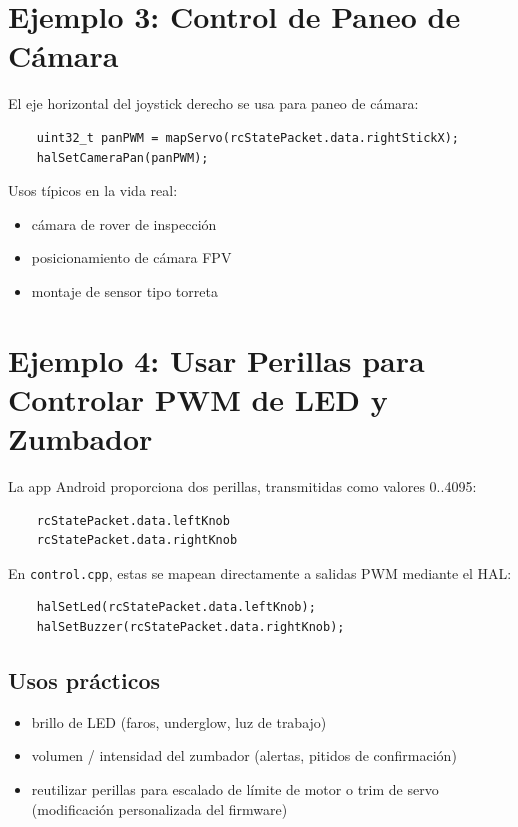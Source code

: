 \section{Ejemplo 3: Control de Paneo de Cámara}
\label{sec:example-camera}

El eje horizontal del joystick derecho se usa para paneo de cámara:

\begin{verbatim}
    uint32_t panPWM = mapServo(rcStatePacket.data.rightStickX);
    halSetCameraPan(panPWM);
\end{verbatim}

\noindent Usos típicos en la vida real:
\begin{itemize}
    \item cámara de rover de inspección
    \item posicionamiento de cámara FPV
    \item montaje de sensor tipo torreta
\end{itemize}

\section{Ejemplo 4: Usar Perillas para Controlar PWM de LED y Zumbador}
\label{sec:example-knobs}

La app Android proporciona dos perillas, transmitidas como valores 0..4095:

\begin{verbatim}
    rcStatePacket.data.leftKnob
    rcStatePacket.data.rightKnob
\end{verbatim}

En \texttt{control.cpp}, estas se mapean directamente a salidas PWM mediante el HAL:

\begin{verbatim}
    halSetLed(rcStatePacket.data.leftKnob);
    halSetBuzzer(rcStatePacket.data.rightKnob);
\end{verbatim}

\subsection*{Usos prácticos}
\begin{itemize}
    \item brillo de LED (faros, underglow, luz de trabajo)
    \item volumen / intensidad del zumbador (alertas, pitidos de confirmación)
    \item reutilizar perillas para escalado de límite de motor o trim de servo (modificación personalizada del firmware)
\end{itemize}

